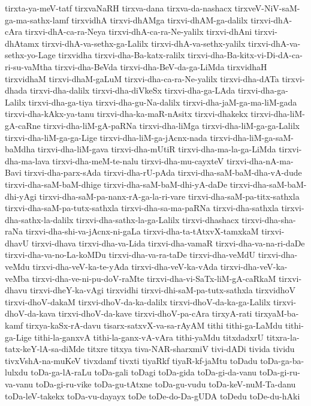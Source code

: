 {tirxta-ya-meV-tatf
tirxvaNaRH
tirxva-dana
tirxva-da-nashacx
tirxveV-NiV-saM-ga-ma-sathx-lamf
tirxvidhA
tirxvi-dhAMga
tirxvi-dhAM-ga-dalilx
tirxvi-dhA-cAra
tirxvi-dhA-ca-ra-Neya
tirxvi-dhA-ca-ra-Ne-yalilx
tirxvi-dhAni
tirxvi-dhAtamx
tirxvi-dhA-va-sethx-ga-Lalilx
tirxvi-dhA-va-sethx-yalilx
tirxvi-dhA-va-sethx-yo-Lage
tirxvidha
tirxvi-dha-Ba-katx-ralilx
tirxvi-dha-Ba-kitx-vi-Di-dA-ca-ri-su-vaMtha
tirxvi-dha-BeVda
tirxvi-dha-BeV-da-ga-LiMda
tirxvidhaH
tirxvidhaM
tirxvi-dhaM-gaLuM
tirxvi-dha-ca-ra-Ne-yalilx
tirxvi-dha-dATa
tirxvi-dhada
tirxvi-dha-dalilx
tirxvi-dha-diVkeSx
tirxvi-dha-ga-LAda
tirxvi-dha-ga-Lalilx
tirxvi-dha-ga-tiya
tirxvi-dha-gu-Na-dalilx
tirxvi-dha-jaM-ga-ma-liM-gada
tirxvi-dha-kAkx-ya-tanu
tirxvi-dha-ka-maR-nAsitx
tirxvi-dhakekx
tirxvi-dha-liM-gA-caRne
tirxvi-dha-liM-gA-paRNa
tirxvi-dha-liMga
tirxvi-dha-liM-ga-ga-Lalilx
tirxvi-dha-liM-ga-ga-Lige
tirxvi-dha-liM-ga-jAcnx-nada
tirxvi-dha-liM-ga-saM-baMdha
tirxvi-dha-liM-gava
tirxvi-dha-mUtiR
tirxvi-dha-ma-la-ga-LiMda
tirxvi-dha-ma-lava
tirxvi-dha-meM-te-nalu
tirxvi-dha-mu-cayxteV
tirxvi-dha-nA-ma-Bavi
tirxvi-dha-parx-sAda
tirxvi-dha-rU-pAda
tirxvi-dha-saM-baM-dha-vA-dude
tirxvi-dha-saM-baM-dhige
tirxvi-dha-saM-baM-dhi-yA-daDe
tirxvi-dha-saM-baM-dhi-yAgi
tirxvi-dha-saM-pa-nanx-rA-ga-la-ri-vare
tirxvi-dha-saM-pa-titx-sathxla
tirxvi-dha-saM-pa-tutx-sathxla
tirxvi-dha-sa-ma-paRNa
tirxvi-dha-sathxla
tirxvi-dha-sathx-la-dalilx
tirxvi-dha-sathx-la-ga-Lalilx
tirxvi-dhashacx
tirxvi-dha-sha-raNa
tirxvi-dha-shi-va-jAcnx-ni-gaLa
tirxvi-dha-ta-tAtxvX-tamxkaM
tirxvi-dhavU
tirxvi-dhava
tirxvi-dha-va-Lida
tirxvi-dha-vamaR
tirxvi-dha-va-na-ri-daDe
tirxvi-dha-va-no-La-koMDu
tirxvi-dha-va-ra-taDe
tirxvi-dha-veMdU
tirxvi-dha-veMdu
tirxvi-dha-veV-ka-te-yAda
tirxvi-dha-veV-ka-vAda
tirxvi-dha-veV-ka-veMba
tirxvi-dha-ve-ni-pu-doV-raMte
tirxvi-dha-vi-SaTx-liM-gA-caRkaM
tirxvi-dhavu
tirxvi-dheY-ka-vAgi
tirxvidhi
tirxvi-dhi-saM-pa-tutx-sathxla
tirxvidhoV
tirxvi-dhoV-dakaM
tirxvi-dhoV-da-ka-dalilx
tirxvi-dhoV-da-ka-ga-Lalilx
tirxvi-dhoV-da-kava
tirxvi-dhoV-da-kave
tirxvi-dhoV-pa-cAra
tirxyA-rati
tirxyaM-ba-kamf
tirxya-kaSx-rA-davu
tisarx-satxvX-va-sa-rAyAM
tithi
tithi-ga-LaMdu
tithi-ga-Lige
tithi-la-ganxvA
tithi-la-ganx-vA-vAra
tithi-yaMdu
titxdadxrU
titxra-la-tatx-keY-lA-sa-diMde
titxre
titxya
tiva-NAR-sharxmiV
tivi-dADi
tivida
tividu
tivxVshA-na-muKeV
tivxdamf
tivxti
tiyaRkf
tiyaR-kf-jaMtu
toDadu
toDa-ga-ba-lulxdu
toDa-ga-lA-raLu
toDa-gali
toDagi
toDa-gida
toDa-gi-da-vanu
toDa-gi-ru-va-vanu
toDa-gi-ru-vike
toDa-gu-tAtxne
toDa-gu-vudu
toDa-keV-nuM-Ta-danu
toDa-leV-takekx
toDa-vu-dayayx
toDe
toDe-do-Da-gUDA
toDedu
toDe-du-hAki
}
